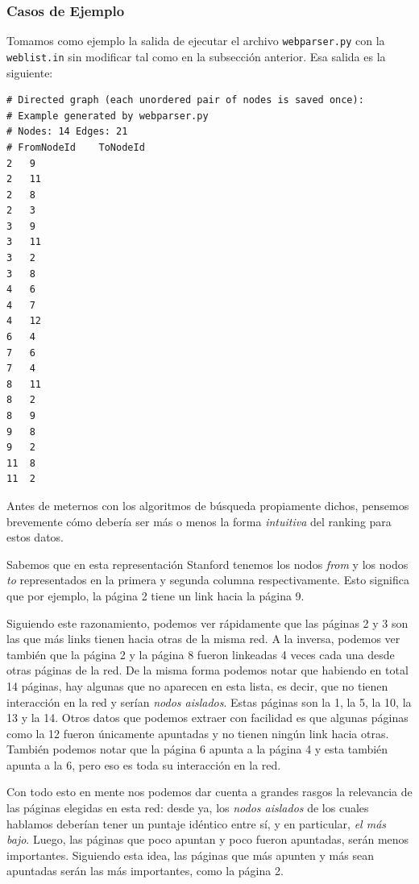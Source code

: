 \subsubsection{Casos de Ejemplo}

Tomamos como ejemplo la salida de ejecutar el archivo \texttt{webparser.py} con la \texttt{weblist.in} sin modificar tal como en la subsección anterior. Esa salida es la siguiente: 

\begin{verbatim}
# Directed graph (each unordered pair of nodes is saved once):
# Example generated by webparser.py
# Nodes: 14 Edges: 21 
# FromNodeId	ToNodeId
2	9
2	11
2	8
2	3
3	9
3	11
3	2
3	8
4	6
4	7
4	12
6	4
7	6
7	4
8	11
8	2
8	9
9	8
9	2
11	8
11	2
\end{verbatim}

Antes de meternos con los algoritmos de búsqueda propiamente dichos, pensemos brevemente cómo debería ser más o menos la forma \textit{intuitiva} del ranking para estos datos.

Sabemos que en esta representación Stanford tenemos los nodos \textit{from} y los nodos \textit{to} representados en la primera y segunda columna respectivamente. Esto significa que por ejemplo, la página 2 tiene un link hacia la página 9.

Siguiendo este razonamiento, podemos ver rápidamente que las páginas 2 y 3 son las que más links tienen hacia otras de la misma red. A la inversa, podemos ver también que la página 2 y la página 8 fueron linkeadas 4 veces cada una desde otras páginas de la red. De la misma forma podemos notar que habiendo en total 14 páginas, hay algunas que no aparecen en esta lista, es decir, que no tienen interacción en la red y serían \textit{nodos aislados}. Estas páginas son la 1, la 5, la 10, la 13 y la 14. Otros datos que podemos extraer con facilidad es que algunas páginas como la 12 fueron únicamente apuntadas y no tienen ningún link hacia otras. También podemos notar que la página 6 apunta a la página 4 y esta también apunta a la 6, pero eso es toda su interacción en la red.

Con todo esto en mente nos podemos dar cuenta a grandes rasgos la relevancia de las páginas elegidas en esta red: desde ya, los \textit{nodos aislados} de los cuales hablamos deberían tener un puntaje idéntico entre sí, y en particular, \textit{el más bajo}. Luego, las páginas que poco apuntan y poco fueron apuntadas, serán menos importantes. Siguiendo esta idea, las páginas que más apunten y más sean apuntadas serán las más importantes, como la página 2. 

